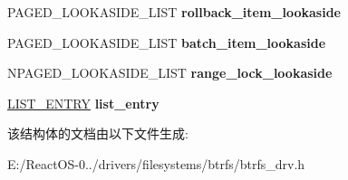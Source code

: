 \begin{DoxyCompactItemize}
P\+A\+G\+E\+D\+\_\+\+L\+O\+O\+K\+A\+S\+I\+D\+E\+\_\+\+L\+I\+ST {\bfseries rollback\+\_\+item\+\_\+lookaside}
\item 
\mbox{\label{struct__device__extension_af6610324b123a658c6401bb538c51d56}} 
P\+A\+G\+E\+D\+\_\+\+L\+O\+O\+K\+A\+S\+I\+D\+E\+\_\+\+L\+I\+ST {\bfseries batch\+\_\+item\+\_\+lookaside}
\item 
\mbox{\label{struct__device__extension_ac80277655772161ad8dfdb5f7b88e41d}} 
N\+P\+A\+G\+E\+D\+\_\+\+L\+O\+O\+K\+A\+S\+I\+D\+E\+\_\+\+L\+I\+ST {\bfseries range\+\_\+lock\+\_\+lookaside}
\item 
\mbox{\label{struct__device__extension_a6b9f6e5bbdfc57b117617eab7e36c0eb}} 
\hyperlink{struct___l_i_s_t___e_n_t_r_y}{L\+I\+S\+T\+\_\+\+E\+N\+T\+RY} {\bfseries list\+\_\+entry}
\end{DoxyCompactItemize}


该结构体的文档由以下文件生成\+:\begin{DoxyCompactItemize}
\item 
E\+:/\+React\+O\+S-\/0../drivers/filesystems/btrfs/btrfs\+\_\+drv.\+h\end{DoxyCompactItemize}
